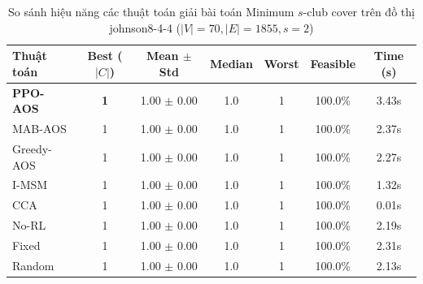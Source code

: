 \begin{table}[htbp]
\centering
\caption{So sánh hiệu năng các thuật toán giải bài toán Minimum $s$-club cover trên đồ thị johnson8-4-4 ($|V|=70, |E|=1855, s=2$)}
\label{tab:results_johnson8_4_4}
\begin{tabular}{lcccccc}
\hline
\textbf{Thuật toán} & \textbf{Best ($|C|$)} & \textbf{Mean $\pm$ Std} & \textbf{Median} & \textbf{Worst} & \textbf{Feasible} & \textbf{Time (s)} \\
\hline
\textbf{PPO-AOS} & \textbf{1} & 1.00 $\pm$ 0.00 & 1.0 & 1 & 100.0\% & 3.43s \\
MAB-AOS & 1 & 1.00 $\pm$ 0.00 & 1.0 & 1 & 100.0\% & 2.37s \\
Greedy-AOS & 1 & 1.00 $\pm$ 0.00 & 1.0 & 1 & 100.0\% & 2.27s \\
I-MSM & 1 & 1.00 $\pm$ 0.00 & 1.0 & 1 & 100.0\% & 1.32s \\
CCA & 1 & 1.00 $\pm$ 0.00 & 1.0 & 1 & 100.0\% & 0.01s \\
No-RL & 1 & 1.00 $\pm$ 0.00 & 1.0 & 1 & 100.0\% & 2.19s \\
Fixed & 1 & 1.00 $\pm$ 0.00 & 1.0 & 1 & 100.0\% & 2.31s \\
Random & 1 & 1.00 $\pm$ 0.00 & 1.0 & 1 & 100.0\% & 2.13s \\
\hline
\end{tabular}
\end{table}
